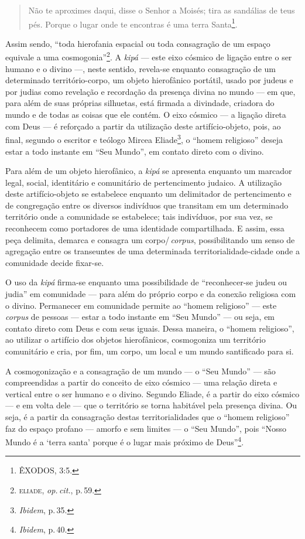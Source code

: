 \begin{quote}
Não te aproximes daqui, disse o Senhor a Moisés; tira as sandálias de
teus pés. Porque o lugar onde te encontras é uma terra Santa\footnote{ÊXODOS,
  3:5.}.
\end{quote}

Assim sendo, ``toda hierofania espacial ou toda consagração de um
espaço equivale a uma cosmogonia''\footnote{\textsc{eliade}, \emph{op.\,cit.}, p.\,59.}.
A \emph{kipá} --- este eixo cósmico de ligação entre o ser humano e o
divino ---, neste sentido, revela-se enquanto consagração de um
determinado território-corpo, um objeto hierofânico portátil, usado por
judeus e por judias como revelação e recordação da presença divina no
mundo --- em que, para além de suas próprias silhuetas, está firmada a
divindade, criadora do mundo e de todas as coisas que ele contém. O eixo
cósmico --- a ligação direta com Deus --- é reforçado a partir da
utilização deste artifício-objeto, pois, ao final, segundo o escritor e
teólogo Mircea Eliade\footnote{\emph{Ibidem}, p.\,35.}, o ``homem
religioso'' deseja estar a todo instante em ``Seu Mundo'', em contato
direto com o divino.

Para além de um objeto hierofânico, a \emph{kipá} se apresenta enquanto
um marcador legal, social, identitário e comunitário de pertencimento
judaico. A utilização deste artifício-objeto se estabelece enquanto um
delimitador de pertencimento e de congregação entre os diversos
indivíduos que transitam em um determinado território onde a comunidade
se estabelece; tais indivíduos, por sua vez, se reconhecem como
portadores de uma identidade compartilhada. E assim, essa peça delimita,
demarca e consagra um corpo/\,\emph{corpus}, possibilitando um senso de agregação
entre os transeuntes de uma determinada territorialidade-cidade onde a
comunidade decide fixar-se.

O uso da \emph{kipá} firma-se enquanto uma possibilidade de
``reconhecer-se judeu ou judia'' em comunidade --- para além do próprio
corpo e da conexão religiosa com o divino. Permanecer em comunidade
permite ao ``homem religioso'' --- este \emph{corpus} de pessoas ---
estar a todo instante em ``Seu Mundo'' --- ou seja, em contato direto
com Deus e com seus iguais. Dessa maneira, o ``homem religioso'', ao
utilizar o artifício dos objetos hierofânicos, cosmogoniza um território
comunitário e cria, por fim, um corpo, um local e um mundo santificado
para si.

A cosmogonização e a consagração de um mundo --- o ``Seu Mundo'' --- são
compreendidas a partir do conceito de eixo cósmico --- uma relação
direta e vertical entre o ser humano e o divino. Segundo Eliade, é a
partir do eixo cósmico --- e em volta dele --- que o território se torna
habitável pela presença divina. Ou seja, é a partir da consagração
destas territorialidades que o ``homem religioso'' faz do espaço profano
--- amorfo e sem limites --- o ``Seu Mundo'', pois ``Nosso Mundo é
a `terra santa' porque é o lugar mais próximo de Deus''\footnote{\emph{Ibidem},
  p.\,40.}.

